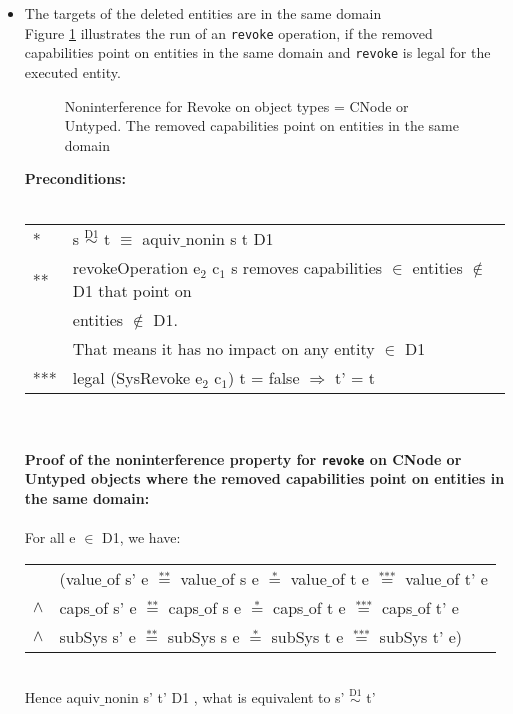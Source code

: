 \begin{itemize}
\item The targets of the deleted entities are in the same domain \\
Figure \ref{fig:RevokeCNode} illustrates the run of an \texttt{revoke} operation, if the removed capabilities point on entities in the same domain and \texttt{revoke} is legal for the executed entity.
\begin{figure}[H]
\caption{Noninterference for Revoke on object types = CNode or Untyped. The removed capabilities point on entities in the same domain}
\label{fig:RevokeCNode}
\end{figure}
\textbf{Preconditions:} \\ \\
\begin{tabular}{ll}
* & s $\overset{\text{D1}}{\sim}$ t $\equiv$ aquiv$\_$nonin s t D1	\\ 
** & revokeOperation e$_2$ c$_1$ s removes capabilities $\in$ entities $\notin$ D1 that point on \\
& entities $\notin$ D1. \\
& That means it has no impact on any entity $\in$ D1 \\ 
*** & legal (SysRevoke e$_2$ c$_1$) t = false $\Rightarrow$ t' = t
\end{tabular} \\ \\ 
\textbf{Proof of the noninterference property for \texttt{revoke} on CNode or Untyped objects where the removed capabilities point on entities in the same domain:}\\ \\
For all e $\in$ D1, we have: \\ 
\begin{tabular}{ll}
& (value$\_$of s' e $\overset{\text{**}}{=}$ value$\_$of s e $\overset{\text{*}}{=}$ value$\_$of t e $\overset{\text{***}}{=}$ value$\_$of t' e \\
$\wedge$ & caps$\_$of s' e $\overset{\text{**}}{=}$ caps$\_$of s e $\overset{\text{*}}{=}$ caps$\_$of t e $\overset{\text{***}}{=}$ caps$\_$of t' e \\
$\wedge$ & subSys s' e $\overset{\text{**}}{=}$ subSys s e $\overset{\text{*}}{=}$ subSys t e $\overset{\text{***}}{=}$ subSys t' e)
\end{tabular} \\
Hence aquiv$\_$nonin s' t' D1 , what is equivalent to s' $\overset{\text{D1}}{\sim}$ t'\\ \\ 

\end{itemize}
